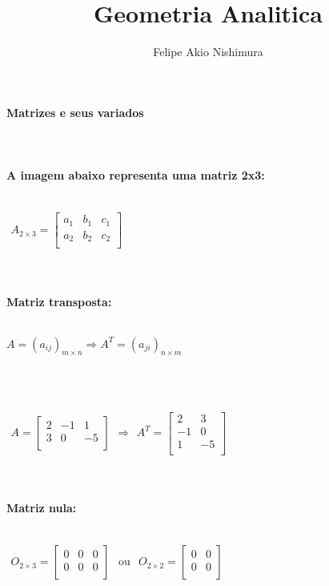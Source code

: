 \documentclass[15pt]{article}
\begin{document}
\title{Geometria Analitica}
\author{Felipe Akio Nishimura}

\maketitle
\textbf{Matrizes e seus variados}\\
\\
\\
\\
\textbf{A imagem abaixo representa uma matriz 2x3:}
\\
\\
\centerline{
$\begin{matrix}
A_{2\times3}=
\begin{bmatrix}
a_1 & b_1 & c_1\\
a_2 & b_2 & c_2\\
\end{bmatrix}
\end{matrix}$
}
\\
\\
\textbf{Matriz transposta:}\\
\\
\centerline{
$A=(a_{ij})_{m\times n} \Rightarrow A^T=(a_{ji})_{n\times m}$
}
\\
\\
\centerline{
$\begin{matrix}
A=
\begin{bmatrix}
2 & -1 & 1\\
3 & 0 & -5\\
\end{bmatrix}
\end{matrix}
\Rightarrow
\begin{matrix}
A^T=
\begin{bmatrix}
2 & 3\\
-1 & 0\\
1 & -5\\
\end{bmatrix}
\end{matrix}$
}\\
\\
\textbf{Matriz nula:}\\
\\
\centerline{
$\begin{matrix}
O_{2\times 3}=
\begin{bmatrix}
0 & 0 & 0\\
0 & 0 & 0\\
\end{bmatrix}
\end{matrix}$
ou
$\begin{matrix}
O_{2\times 2}=
\begin{bmatrix}
0 & 0\\
0 & 0\\
\end{bmatrix}
\end{matrix}$
}\\
\end{document}

